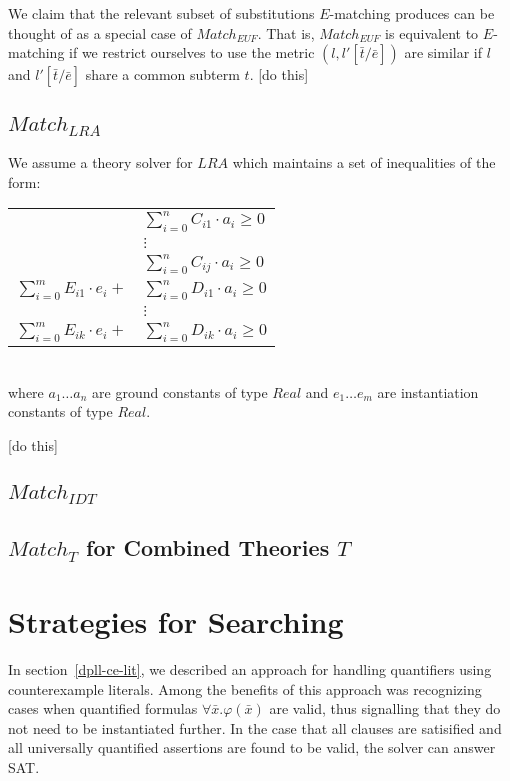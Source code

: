 \documentclass{llncs}
\begin{document}
We claim that the relevant subset of substitutions $E$-matching produces can be thought of as a special case of $Match_{EUF}$.
That is, $Match_{EUF}$ is equivalent to $E$-matching if we restrict ourselves to use the metric $( l, l'[ \bar{ t }/\bar{ e }]  )$ are similar if $l$ and $l'[ \bar{ t }/\bar{ e }]$ share a common subterm $t$.
[do this]

\subsection{$Match_{LRA}$}

We assume a theory solver for $LRA$ which maintains a set of inequalities of the form:

\begin{tabular}{rl}
 & $\displaystyle\sum\limits_{i=0}^n C_{i1} \cdot a_i \geq 0$ \\
 & $\vdots$ \\
 & $\displaystyle\sum\limits_{i=0}^n C_{ij} \cdot a_i \geq 0$ \\
 $\displaystyle\sum\limits_{i=0}^m E_{i1} \cdot e_i +$ & $\displaystyle\sum\limits_{i=0}^n D_{i1} \cdot a_i \geq 0$ \\
 & $\vdots$ \\
 $\displaystyle\sum\limits_{i=0}^m E_{ik} \cdot e_i +$ & $\displaystyle\sum\limits_{i=0}^n D_{ik} \cdot a_i \geq 0$ \\
 \end{tabular} \\

where $a_1 \ldots a_n$ are ground constants of type $Real$ and $e_1 \ldots e_m$ are instantiation constants of type $Real$.

[do this]

\subsection{$Match_{IDT}$}

\subsection{$Match_{T}$ for Combined Theories $T$}

\section{Strategies for Searching}

In section~\ref{dpll-ce-lit}, we described an approach for handling quantifiers using counterexample literals.
Among the benefits of this approach was recognizing cases when quantified formulas $\forall \bar{x}. \varphi( \bar{x} )$ are valid, thus signalling that they do not need to be instantiated further.
In the case that all clauses are satisified and all universally quantified assertions are found to be valid, the solver can answer SAT.
\end{document}
